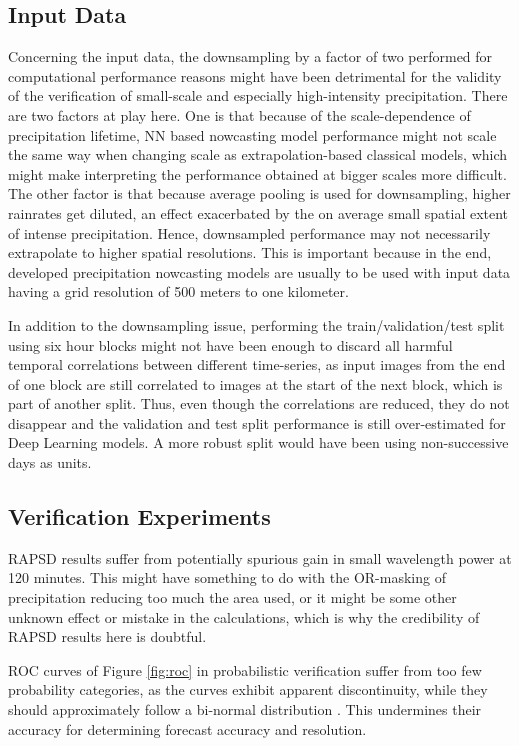\subsection{Input Data}

Concerning the input data, the downsampling by a factor of two performed for computational performance reasons might have been detrimental for the validity of the verification of small-scale and especially high-intensity precipitation. There are two factors at play here. One is that because of the scale-dependence of precipitation lifetime, NN based nowcasting model performance might not scale the same way when changing scale as extrapolation-based classical models, which might make interpreting the performance obtained at bigger scales more difficult. The other factor is that because average pooling is used for downsampling, higher rainrates get diluted, an effect exacerbated by the on average small spatial extent of intense precipitation. Hence, downsampled performance may not necessarily extrapolate to higher spatial resolutions. This is important because in the end, developed precipitation nowcasting models are usually to be used with input data having a grid resolution of 500 meters to one kilometer. 

In addition to the downsampling issue, performing the train/validation/test split using six hour blocks might not have been enough to discard all harmful temporal correlations between different time-series, as input images from the end of one block are still correlated to images at the start of the next block, which is part of another split. Thus, even though the correlations are reduced, they do not disappear and the validation and test split performance is still over-estimated for Deep Learning models. A more robust split would have been using non-successive days as units.

\subsection{Verification Experiments}

RAPSD results suffer from potentially spurious gain in small wavelength power at 120 minutes. This might have something to do with the OR-masking of precipitation reducing too much the area used, or it might be some other unknown effect or mistake in the calculations, which is why the credibility of RAPSD results here is doubtful. 

ROC curves of Figure \ref{fig:roc} in probabilistic verification suffer from too few probability categories, as the curves exhibit apparent discontinuity, while they should approximately follow a bi-normal distribution \cite{mason1982model}. This undermines their accuracy for determining forecast accuracy and resolution.

